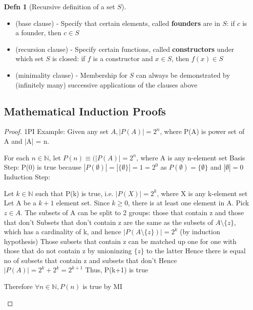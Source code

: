 \documentclass[a4paper]{article}
\theoremstyle{definition}
\newtheorem*{defn}{Defn}
\begin{document}
\begin{defn}[Recursive definition of a set $S$]\ 
  \begin{itemize}
    \item (base clause) - Specify that certain elements, called \textbf{founders} are in $S$: if $c$ is a founder, then $c \in S$
    \item (recursion clause) - Specify certain functions, called \textbf{constructors} under which set $S$ is closed: if $f$ is a constructor and $x \in S$, then $f(x) \in S$
    \item (minimality clause) - Membership for $S$ can always be demonstrated by (infinitely many) successive applications of the clauses above
  \end{itemize}
\end{defn}

\subsection*{Mathematical Induction Proofs}

\begin{proof}1PI Example: Given any set $A, |P(A)| = 2^n$, where P(A) is power set of A and |A| = n.
  \begin{numpf}
    \pfln For each $n \in \mathbb{N}$, let $P(n) \equiv (|P(A)| = 2^n$, where A is any n-element set
    \pfln Basis Step: P(0) is true because $|P(\emptyset)| = |\{\emptyset\}| = 1 = 2^0$ as $P(\emptyset) = \{\emptyset\}$ and $|\emptyset| = 0$
    \pfln Induction Step:
    \begin{subpf}
      \pfln Let $k \in \mathbb{N}$ such that P(k) is true, i.e. $|P(X)| = 2^k$, where X is any k-element set
      \pfln Let A be a $k+1$ element set.
      \pfln Since $k \geq 0$, there is at least one element in A. Pick $z \in A$.
      \pfln The subsets of A can be split to 2 groups: those that contain z and those that don't
      \pfln Subsets that don't contain z are the same as the subsets of $A \setminus \{z\}$, which has a cardinality of k, and hence $|P(A\setminus \{z\})| = 2^k$ (by induction hypothesis)
      \pfln Those subsets that contain z can be matched up one for one with those that do not contain z by unioninzing $\{z\}$ to the latter
      \pfln Hence there is equal no of subsets that contain z and subsets that don't
      \pfln Hence $|P(A)| = 2^k + 2^k = 2^{k+1}$
      \pfln Thus, P(k+1) is true
    \end{subpf}
    \pfln Therefore $\forall n \in \mathbb{N}, P(n)$ is true by MI
  \end{numpf}

\end{proof}
\end{document}
